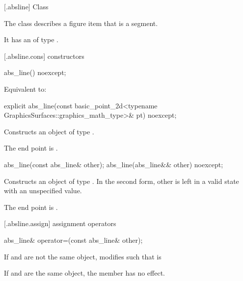  [\iotwod.absline] {Class }

\pnum
{}%
The class  describes a figure item that is a segment.

\pnum
It has an  of type .

 [\iotwod.absline.cons] { constructors}

%
\begin{itemdecl}
abs_line() noexcept;
\end{itemdecl}
\begin{itemdescr}
\pnum
\effects
Equivalent to: 
\end{itemdescr}

%
\begin{itemdecl}
explicit abs_line(const basic_point_2d<typename
  GraphicsSurfaces::graphics_math_type>& pt) noexcept;
\end{itemdecl}
\begin{itemdescr}
\pnum
\effects
Constructs an object of type .

\pnum
The end point is .
\end{itemdescr}

%
\begin{itemdecl}
abs_line(const abs_line& other);
abs_line(abs_line&& other) noexcept;
\end{itemdecl}
\begin{itemdescr}
\pnum
\effects
Constructs an object of type . In the second form, other is left in a valid state with an unspecified value.

\pnum
The end point is .
\end{itemdescr}

 [\iotwod.absline.assign] { assignment operators}

%
\begin{itemdecl}
abs_line& operator=(const abs_line& other);
\end{itemdecl}
\begin{itemdescr}
\pnum
\effects
If  and  are not the same object, modifies  such that  is 

\pnum
If  and  are the same object, the member has no effect.

\pnum
\returns
{}
\end{itemdescr}

